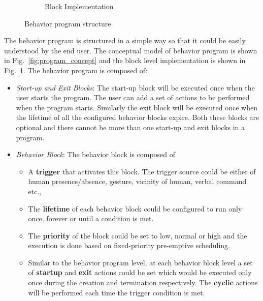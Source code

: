 \documentclass{llncs}
\begin{document}
\begin{figure}
\begin{subfigure}[t]{0.48\textwidth}
\caption[Block Implementation]{Block Implementation}
\label{fig:program_blocks}
\end{subfigure}
\caption[Program Structure]{Behavior program structure}
\label{fig:program}
\end{figure}
The behavior program is structured in a simple way so that it could be easily understood by the end user. The conceptual model of behavior program is shown in Fig.~\ref{fig:program_concept} and the block level implementation is shown in Fig.~\ref{fig:program_blocks}. The behavior program is composed of:
\begin{itemize}
\item \emph{Start-up and Exit Blocks}: The start-up block will be executed once when the user starts the program. The user can add a set of actions to be performed when the program starts. Similarly the exit block will be executed once when the lifetime of all the configured behavior blocks expire.  Both these blocks are optional and there cannot be more than one start-up and exit blocks in a program.
\item \emph{Behavior Block}: The behavior block is composed of
\begin{itemize}
\item A \textbf{trigger} that activates this block. The trigger source could be either of human presence/absence, gesture, vicinity of human, verbal command etc.,
\item The \textbf{lifetime} of each behavior block could be configured to run only once, forever or until a condition is met. 
\item The \textbf{priority} of the block could be set to low, normal or high and the execution is done based on fixed-priority pre-emptive scheduling.
\item Similar to the behavior program level, at each behavior block level a set of \textbf{startup} and \textbf{exit} actions could be set which would be executed only once during the creation and termination respectively. The \textbf{cyclic} actions will be performed each time the trigger condition is met.
\end{itemize}
\end{itemize}
\end{document}
